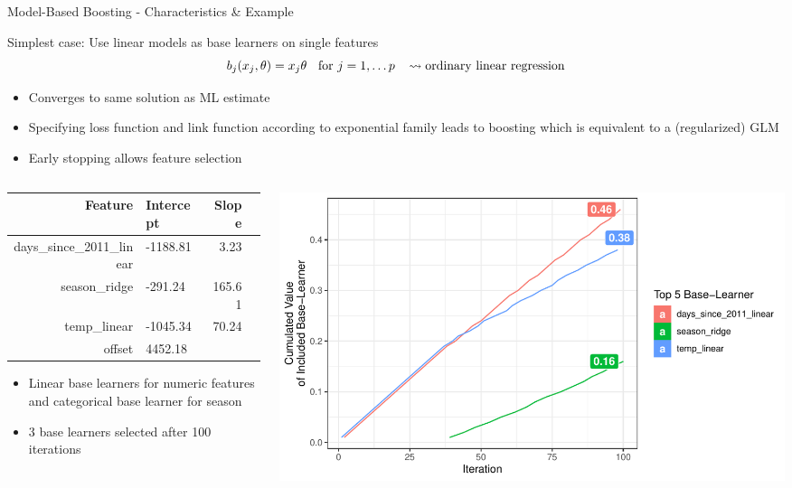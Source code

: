 \documentclass[11pt,compress,t,notes=noshow, aspectratio=169, xcolor=table]{beamer}
\begin{document}
\begin{frame}{Model-Based Boosting - Characteristics \& Example}

Simplest case: Use linear models as base learners on single features
$$
b_j(x_j, \theta) = x_j\theta \hspace*{0.2cm}\text{ for } j = 1,\ldots p \hspace*{0.3cm} \leadsto \text{ordinary linear regression}
$$

\begin{itemize}
\item Converges to same solution as ML estimate
\item Specifying loss function and link function according to exponential family leads to boosting which is equivalent to a (regularized) GLM
\item Early stopping allows feature selection

\end{itemize}
\pause
\begin{columns}[T]
\begin{column}{0.4\textwidth}
\scriptsize
  \begin{table}[ht]
\centering
\begin{tabular}{rlrr}
  \hline
 Feature & Intercept & Slope \\ 
  \hline
days\_since\_2011\_linear & -1188.81 & 3.23 \\ 
 season\_ridge & -291.24 & 165.61 \\ 
 temp\_linear & -1045.34 & 70.24 \\ 
 offset & 4452.18 &  \\ 
   \hline
\end{tabular}
\end{table}
\begin{itemize}
    \item Linear base learners for numeric features and categorical base learner for season
    \item 3 base learners selected after 100 iterations
\end{itemize}
\end{column}
\begin{column}{0.55\textwidth}
  \includegraphics[width = .95 \textwidth]{figure/compboost_base_linear.pdf} 
\end{column}
\end{columns}
\end{frame}
\end{document}
